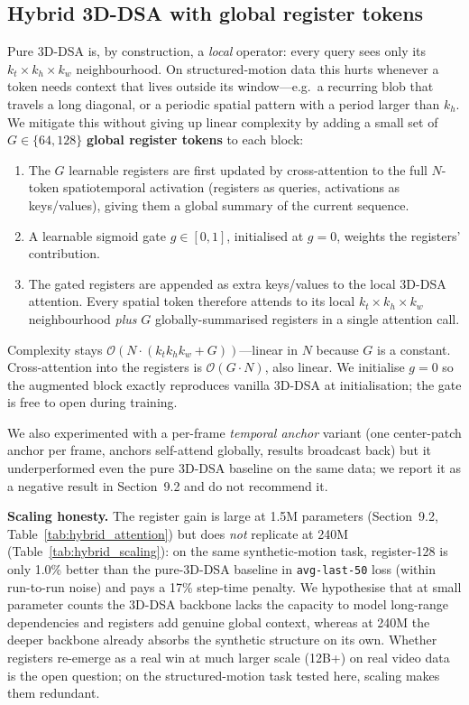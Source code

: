 \documentclass[11pt, letterpaper]{article}
\begin{document}
\subsection{Hybrid 3D-DSA with global register tokens}
Pure 3D-DSA is, by construction, a \emph{local} operator: every query sees only its $k_t \times k_h \times k_w$ neighbourhood. On structured-motion data this hurts whenever a token needs context that lives outside its window---e.g.\ a recurring blob that travels a long diagonal, or a periodic spatial pattern with a period larger than $k_h$. We mitigate this without giving up linear complexity by adding a small set of $G \in \{64, 128\}$ \textbf{global register tokens} to each block:
\begin{enumerate}
    \item The $G$ learnable registers are first updated by cross-attention to the full $N$-token spatiotemporal activation (registers as queries, activations as keys/values), giving them a global summary of the current sequence.
    \item A learnable sigmoid gate $g \in [0,1]$, initialised at $g = 0$, weights the registers' contribution.
    \item The gated registers are appended as extra keys/values to the local 3D-DSA attention. Every spatial token therefore attends to its local $k_t \times k_h \times k_w$ neighbourhood \emph{plus} $G$ globally-summarised registers in a single attention call.
\end{enumerate}
Complexity stays $\mathcal{O}\!\left(N\!\cdot\!(k_t k_h k_w + G)\right)$---linear in $N$ because $G$ is a constant. Cross-attention into the registers is $\mathcal{O}(G \cdot N)$, also linear. We initialise $g = 0$ so the augmented block exactly reproduces vanilla 3D-DSA at initialisation; the gate is free to open during training.

We also experimented with a per-frame \emph{temporal anchor} variant (one center-patch anchor per frame, anchors self-attend globally, results broadcast back) but it underperformed even the pure 3D-DSA baseline on the same data; we report it as a negative result in Section~9.2 and do not recommend it.

\textbf{Scaling honesty.} The register gain is large at 1.5M parameters (Section~9.2, Table~\ref{tab:hybrid_attention}) but does \emph{not} replicate at 240M (Table~\ref{tab:hybrid_scaling}): on the same synthetic-motion task, register-128 is only 1.0\% better than the pure-3D-DSA baseline in \texttt{avg-last-50} loss (within run-to-run noise) and pays a 17\% step-time penalty. We hypothesise that at small parameter counts the 3D-DSA backbone lacks the capacity to model long-range dependencies and registers add genuine global context, whereas at 240M the deeper backbone already absorbs the synthetic structure on its own. Whether registers re-emerge as a real win at much larger scale (12B+) on real video data is the open question; on the structured-motion task tested here, scaling makes them redundant.
\end{document}
